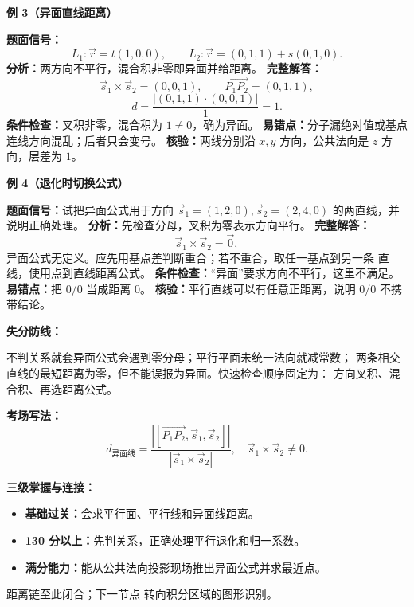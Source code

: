 \begin{knowledgeBox}
\textbf{例 3（异面直线距离）}

\textbf{题面信号：}
\[
L_1:\vec r=t(1,0,0),\qquad
L_2:\vec r=(0,1,1)+s(0,1,0).
\]
\textbf{分析：}两方向不平行，混合积非零即异面并给距离。
\textbf{完整解答：}
\[
\vec s_1\times\vec s_2=(0,0,1),\qquad
\overrightarrow{P_1P_2}=(0,1,1),
\]
\[
d=\frac{|(0,1,1)\cdot(0,0,1)|}{1}=1.
\]
\textbf{条件检查：}叉积非零，混合积为 \(1\ne0\)，确为异面。
\textbf{易错点：}分子漏绝对值或基点连线方向混乱；后者只会变号。
\textbf{核验：}两线分别沿 \(x,y\) 方向，公共法向是 \(z\) 方向，层差为 \(1\)。

\textbf{例 4（退化时切换公式）}

\textbf{题面信号：}试把异面公式用于方向
\(\vec s_1=(1,2,0),\vec s_2=(2,4,0)\) 的两直线，并说明正确处理。
\textbf{分析：}先检查分母，叉积为零表示方向平行。
\textbf{完整解答：}
\[
\vec s_1\times\vec s_2=\vec0,
\]
异面公式无定义。应先用基点差判断重合；若不重合，取任一基点到另一条
直线，使用点到直线距离公式。
\textbf{条件检查：}“异面”要求方向不平行，这里不满足。
\textbf{易错点：}把 \(0/0\) 当成距离 \(0\)。
\textbf{核验：}平行直线可以有任意正距离，说明 \(0/0\) 不携带结论。

\textbf{失分防线：}

不判关系就套异面公式会遇到零分母；平行平面未统一法向就减常数；
两条相交直线的最短距离为零，但不能误报为异面。快速检查顺序固定为：
方向叉积、混合积、再选距离公式。

\textbf{考场写法：}
\[
\boxed{d_{\text{异面线}}=
\frac{|[\overrightarrow{P_1P_2},\vec s_1,\vec s_2]|}
{|\vec s_1\times\vec s_2|},\quad
\vec s_1\times\vec s_2\ne0.}
\]

\textbf{三级掌握与连接：}
\begin{itemize}
  \item \textbf{基础过关：}会求平行面、平行线和异面线距离。
  \item \textbf{130 分以上：}先判关系，正确处理平行退化和归一系数。
  \item \textbf{满分能力：}能从公共法向投影现场推出异面公式并求最近点。
\end{itemize}
距离链至此闭合；下一节点
转向积分区域的图形识别。
\end{knowledgeBox}



